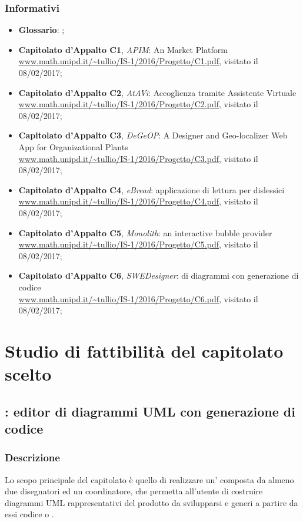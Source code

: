 		\subsubsection{Informativi}
		\begin{itemize}
			\item \textbf{Glossario}: \Glossario;
			\item \textbf{Capitolato d'Appalto C1}, \emph{APIM}: An  Market Platform \\
			\url{www.math.unipd.it/~tullio/IS-1/2016/Progetto/C1.pdf}, visitato il 08/02/2017;
			\item \textbf{Capitolato d'Appalto C2}, \emph{AtAVi}: Accoglienza tramite Assistente Virtuale \\
			\url{www.math.unipd.it/~tullio/IS-1/2016/Progetto/C2.pdf}, visitato il 08/02/2017;
			\item \textbf{Capitolato d'Appalto C3}, \emph{DeGeOP}: A Designer and Geo-localizer Web App for Organizational Plants \\
			\url{www.math.unipd.it/~tullio/IS-1/2016/Progetto/C3.pdf}, visitato il 08/02/2017;
			\item \textbf{Capitolato d'Appalto C4}, \emph{eBread}: applicazione di lettura per dislessici \\
			\url{www.math.unipd.it/~tullio/IS-1/2016/Progetto/C4.pdf}, visitato il 08/02/2017;
			\item \textbf{Capitolato d'Appalto C5}, \emph{Monolith}: an interactive bubble provider \\
			\url{www.math.unipd.it/~tullio/IS-1/2016/Progetto/C5.pdf}, visitato il 08/02/2017;
			\item \textbf{Capitolato d'Appalto C6}, \emph{SWEDesigner}:  di diagrammi  con generazione di codice \\
			\url{www.math.unipd.it/~tullio/IS-1/2016/Progetto/C6.pdf}, visitato il 08/02/2017;
		\end{itemize}


	
\section{Studio di fattibilità del capitolato scelto}
	\subsection{\proj: editor di diagrammi UML con generazione di codice}
		\subsubsection{Descrizione}
		Lo scopo principale del capitolato è quello di realizzare un' composta da almeno due disegnatori
		ed un coordinatore, che permetta all'utente di costruire diagrammi UML rappresentativi del prodotto da svilupparsi e generi a partire da essi codice  o .
		

